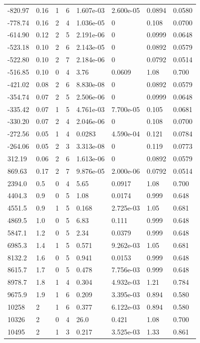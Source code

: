\documentclass[preview]{standalone}
\begin{document}
{{\begin{tabular}{L{1.2cm}C{1.2cm} C{0.3cm}C{0.5cm} C{1.4cm}C{1.4cm} C{1.4cm}C{1.4cm}}
  -820.97  &  0.16  & 1     &  6 &  1.607e-03  & 2.600e-05  & 0.0894 &  0.0580   \\ 
  -778.74  &  0.16  & 2     &  4 &  1.036e-05  & 0  & 0.108 &  0.0700   \\ 
  -614.90  &  0.12  & 2     &  5 &  2.191e-06  & 0  & 0.0999 &  0.0648   \\ 
  -523.18  &  0.10  & 2     &  6 &  2.143e-05  & 0  & 0.0892 &  0.0579   \\ 
  -522.80  &  0.10  & 2     &  7 &  2.184e-06  & 0  & 0.0792 &  0.0514   \\ 
  -516.85  &  0.10  & 0     &  4 &  3.76  & 0.0609  & 1.08 &  0.700   \\ 
  -421.02  &  0.08  & 2     &  6 &  8.830e-08  & 0  & 0.0892 &  0.0579   \\ 
  -354.74  &  0.07  & 2     &  5 &  2.506e-06  & 0  & 0.0999 &  0.0648   \\ 
  -335.42  &  0.07  & 1     &  5 &  4.761e-03  & 7.700e-05  & 0.105 &  0.0681   \\ 
  -330.20  &  0.07  & 2     &  4 &  2.046e-06  & 0  & 0.108 &  0.0700   \\ 
  -272.56  &  0.05  & 1     &  4 &  0.0283  & 4.590e-04  & 0.121 &  0.0784   \\ 
  -264.06  &  0.05  & 2     &  3 &  3.313e-08  & 0  & 0.119 &  0.0773   \\ 
  312.19  &  0.06  & 2     &  6 &  1.613e-06  & 0  & 0.0892 &  0.0579   \\ 
  869.63  &  0.17  & 2     &  7 &  9.876e-05  & 2.000e-06  & 0.0792 &  0.0514   \\ 
  2394.0  &   0.5  & 0     &  4 &  5.65  & 0.0917  & 1.08 &  0.700   \\ 
  4404.3  &   0.9  & 0     &  5 &  1.08  & 0.0174  & 0.999 &  0.648   \\ 
  4551.5  &   0.9  & 1     &  5 &  0.168  & 2.725e-03  & 1.05 &  0.681   \\ 
  4869.5  &   1.0  & 0     &  5 &  6.83  & 0.111  & 0.999 &  0.648   \\ 
  5847.1  &   1.2  & 0     &  5 &  2.34  & 0.0379  & 0.999 &  0.648   \\ 
  6985.3  &   1.4  & 1     &  5 &  0.571  & 9.262e-03  & 1.05 &  0.681   \\ 
  8132.2  &   1.6  & 0     &  5 &  0.941  & 0.0153  & 0.999 &  0.648   \\ 
  8615.7  &   1.7  & 0     &  5 &  0.478  & 7.756e-03  & 0.999 &  0.648   \\ 
  8978.7  &   1.8  & 1     &  4 &  0.304  & 4.932e-03  & 1.21 &  0.784   \\ 
  9675.9  &   1.9  & 1     &  6 &  0.209  & 3.395e-03  & 0.894 &  0.580   \\ 
  10258  &     2  & 1     &  6 &  0.377  & 6.122e-03  & 0.894 &  0.580   \\ 
  10326  &     2  & 0     &  4 &  26.0  & 0.421  & 1.08 &  0.700   \\ 
  10495  &     2  & 1     &  3 &  0.217  & 3.525e-03  & 1.33 &  0.861   \\ 
\hline 
\end{tabular} 

}}
\end{document}
